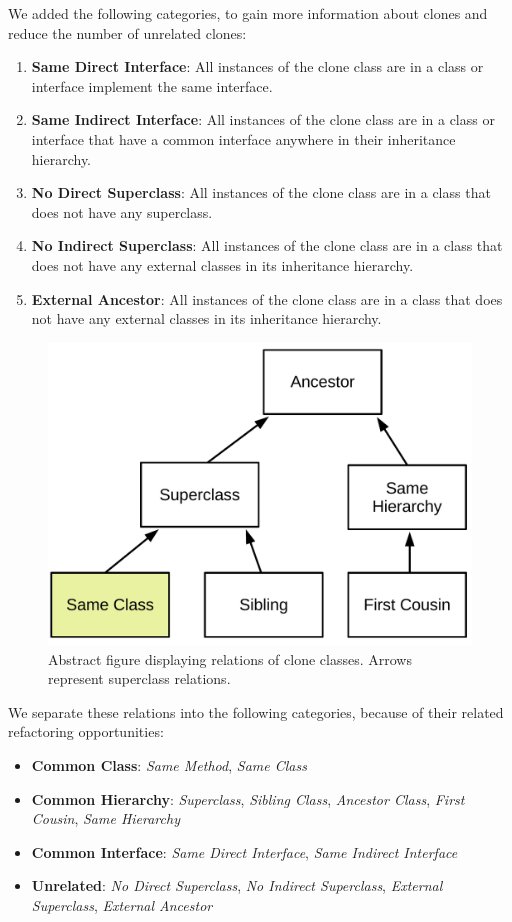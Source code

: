 \documentclass[runningheads]{llncs}
\begin{document}
We added the following categories, to gain more information about clones and reduce the number of unrelated clones:

\begin{enumerate}
\item \textbf{Same Direct Interface}: All instances of the clone class are in a class or interface implement the same interface.
\item \textbf{Same Indirect Interface}: All instances of the clone class are in a class or interface that have a common interface anywhere in their inheritance hierarchy.
\item \textbf{No Direct Superclass}: All instances of the clone class are in a class that does not have any superclass.
\item \textbf{No Indirect Superclass}: All instances of the clone class are in a class that does not have any external classes in its inheritance hierarchy.
\item \textbf{External Ancestor}: All instances of the clone class are in a class that does not have any external classes in its inheritance hierarchy.
\end{enumerate}

\begin{figure}[H]
  \centering
    \includegraphics[width=0.6\columnwidth]{img/Relation}
      \caption{Abstract figure displaying relations of clone classes. Arrows represent superclass relations.}
  \label{fig:clonerelation}
\end{figure}

We separate these relations into the following categories, because of their related refactoring opportunities:
\begin{itemize}
  \item \textbf{Common Class}: \textit{Same Method}, \textit{Same Class}
  \item \textbf{Common Hierarchy}: \textit{Superclass}, \textit{Sibling Class}, \textit{Ancestor Class}, \textit{First Cousin}, \textit{Same Hierarchy}
  \item \textbf{Common Interface}: \textit{Same Direct Interface}, \textit{Same Indirect Interface}
  \item \textbf{Unrelated}: \textit{No Direct Superclass}, \textit{No Indirect Superclass}, \textit{External Superclass}, \textit{External Ancestor}
\end{itemize}
\end{document}
